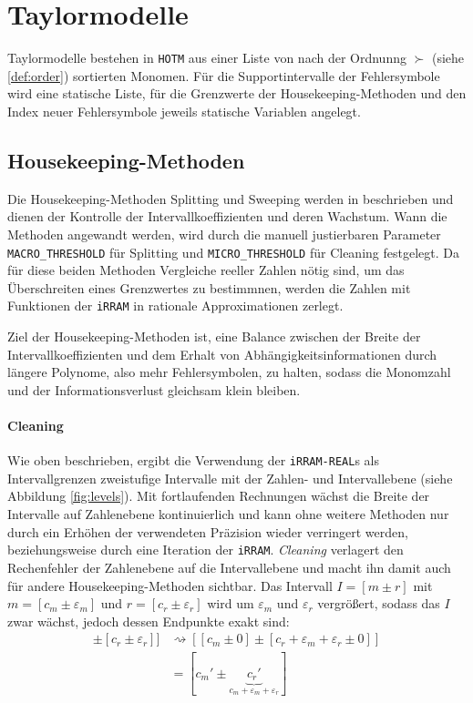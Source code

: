 \section{Taylormodelle}
Taylormodelle bestehen in \verb+HOTM+ aus einer Liste von nach der Ordnunng $\succ$ (siehe \ref{def:order}) sortierten Monomen. Für die Supportintervalle der Fehlersymbole wird eine statische Liste, für die Grenzwerte der Housekeeping-Methoden und den Index neuer Fehlersymbole jeweils statische Variablen angelegt.
\subsection{Housekeeping-Methoden}
Die Housekeeping-Methoden Splitting und Sweeping werden in \cite{DBLP:conf/macis/BrausseKM15} beschrieben und dienen der Kontrolle der Intervallkoeffizienten und deren Wachstum. Wann die Methoden angewandt werden, wird durch die manuell justierbaren Parameter \verb+MACRO_THRESHOLD+ für Splitting und \verb+MICRO_THRESHOLD+ für Cleaning festgelegt. Da für diese beiden Methoden Vergleiche reeller Zahlen nötig sind, um das Überschreiten eines Grenzwertes zu bestimmnen, werden die Zahlen mit Funktionen der \verb+iRRAM+ in rationale Approximationen zerlegt.

Ziel der Housekeeping-Methoden ist, eine Balance zwischen der Breite der Intervallkoeffizienten und dem Erhalt von Abhängigkeitsinformationen durch längere Polynome, also mehr Fehlersymbolen, zu halten, sodass die Monomzahl und der Informationsverlust gleichsam klein bleiben.

\paragraph{Cleaning}
\label{par:cleaning}
Wie oben beschrieben, ergibt die Verwendung der \verb+iRRAM-REAL+s als Intervallgrenzen zweistufige Intervalle mit der Zahlen- und Intervallebene (siehe Abbildung \ref{fig:levels}). Mit fortlaufenden Rechnungen wächst die Breite der Intervalle auf Zahlenebene kontinuierlich und kann ohne weitere Methoden nur durch ein Erhöhen der verwendeten Präzision wieder verringert werden, beziehungsweise durch eine Iteration der \verb+iRRAM+. \textit{Cleaning} verlagert den Rechenfehler der Zahlenebene auf die Intervallebene und macht ihn damit auch für andere Housekeeping-Methoden sichtbar. Das Intervall $I=[m \pm r]$ mit $m=[c_m \pm \varepsilon_m]$ und $r = [c_r \pm \varepsilon_r]$ wird um $\varepsilon_m$ und $\varepsilon_r$ vergrößert, sodass das $I$ zwar wächst, jedoch dessen Endpunkte exakt sind:
\begin{align*}[[c_m \pm \varepsilon_m] \pm [c_r \pm \varepsilon_r]] &\rightsquigarrow [[c_m \pm 0] \pm [c_r + \varepsilon_m +\varepsilon_r  \pm 0]] \\
&= [c_m' \pm \underbrace{c_r'}_{c_m + \varepsilon_m +\varepsilon_r}  ]\end{align*}


